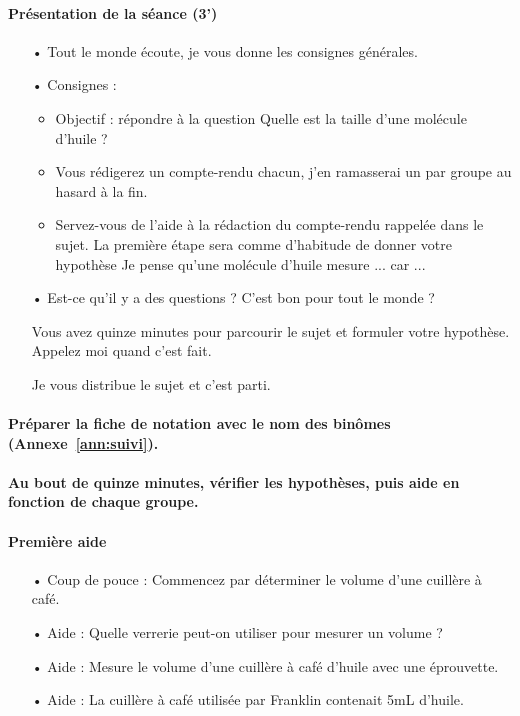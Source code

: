 \documentclass[12pt,a4paper, fleqn]{report}
\begin{document}
\paragraph{Présentation de la séance (3')}
\begin{itemize}
\item[•]  \og Tout le monde écoute, je vous donne les consignes générales.\fg{}

\item[•] Consignes :
\begin{itemize}
\item Objectif : répondre à la question \og Quelle est la taille d'une molécule d'huile ? \fg{}
\item \og Vous rédigerez un compte-rendu chacun, j'en ramasserai un par groupe au hasard à la fin. \fg{}
\item \og Servez-vous de l'aide à la rédaction du compte-rendu rappelée dans le sujet.
La première étape sera comme d'habitude de donner votre hypothèse \og Je pense qu'une molécule d'huile mesure ... car ... \fg{}
\end{itemize}

\item[•] \og Est-ce qu'il y a des questions ?
C'est bon pour tout le monde ?

Vous avez quinze minutes pour parcourir le sujet et formuler votre hypothèse.
Appelez moi quand c'est fait.

Je vous distribue le sujet et c'est parti.
\fg{}
\end{itemize}

\paragraph{Préparer la fiche de notation avec le nom des binômes (Annexe~\ref{ann:suivi}).}

\paragraph{Au bout de quinze minutes, vérifier les hypothèses, puis aide en fonction de chaque groupe.}

\paragraph{Première aide}
\begin{itemize}
\item[•] Coup de pouce : Commencez par déterminer le volume d'une cuillère à café.
\item[•] Aide : Quelle verrerie peut-on utiliser pour mesurer un volume ?
\item[•] Aide : Mesure le volume d'une cuillère à café d'huile avec une éprouvette.
\item[•] Aide : La cuillère à café utilisée par Franklin contenait \unit{5}{mL} d'huile.
\end{itemize}
\end{document}
